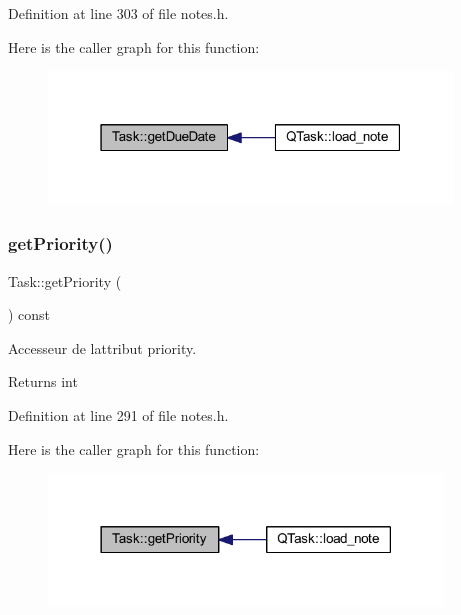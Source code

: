 Definition at line 303 of file notes.\+h.

Here is the caller graph for this function\+:\nopagebreak
\begin{figure}[H]
\begin{center}
\leavevmode
\includegraphics[width=304pt]{class_task_abee7cd65af2bb2028dfaa3ec0d10bfe5_icgraph}
\end{center}
\end{figure}
\mbox{\label{class_task_a3fbfcf08d8976c01282220f7f4c74c91}} 
\subsubsection{\texorpdfstring{get\+Priority()}{getPriority()}}
{\footnotesize\ttfamily Task\+::get\+Priority (\begin{DoxyParamCaption}{ }\end{DoxyParamCaption}) const\hspace{0.3cm}{\ttfamily [inline]}}



Accesseur de l\textquotesingle{}attribut priority. 

\begin{DoxyReturn}{Returns}
int 
\end{DoxyReturn}


Definition at line 291 of file notes.\+h.

Here is the caller graph for this function\+:\nopagebreak
\begin{figure}[H]
\begin{center}
\leavevmode
\includegraphics[width=297pt]{class_task_a3fbfcf08d8976c01282220f7f4c74c91_icgraph}
\end{center}
\end{figure}
\mbox{\label{class_task_a3eff8551f6ca6e268a2127388a097720}} 
